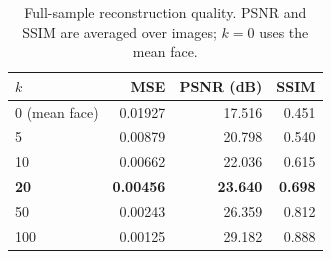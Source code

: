 \begin{table}[!t]
  \caption{Full-sample reconstruction quality. PSNR and SSIM are
  averaged over images; $k=0$ uses the mean face.}
  \label{tab:k}
  \centering
  \footnotesize
  \setlength{\tabcolsep}{7pt}
  \begin{tabular}{@{}lrrr@{}}
    \toprule
    $k$ & MSE & PSNR (dB) & SSIM \\
    \midrule
    0 (mean face) & 0.01927 & 17.516 & 0.451 \\
    5 & 0.00879 & 20.798 & 0.540 \\
    10 & 0.00662 & 22.036 & 0.615 \\
    \textbf{20} & \textbf{0.00456} & \textbf{23.640} & \textbf{0.698} \\
    50 & 0.00243 & 26.359 & 0.812 \\
    100 & 0.00125 & 29.182 & 0.888 \\
    \bottomrule
  \end{tabular}
\end{table}
